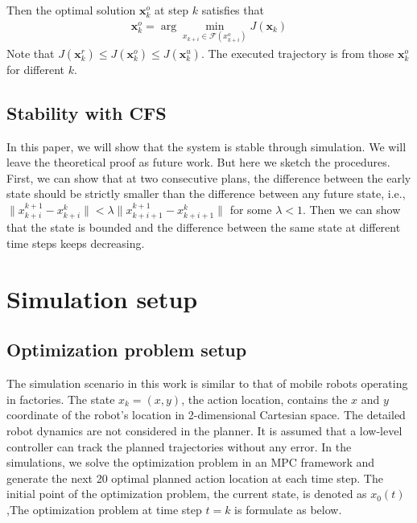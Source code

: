 \documentclass{ifacconf}
\begin{document}
Then the optimal solution $\mathbf{x}_k^{o}$ at step $k$ satisfies that
\begin{eqnarray}
\mathbf{x}_k^{o} = \arg\min_{x_{k+i}\in \mathcal{F}(x_{k+i}^o)}J(\mathbf{x}_k)
\end{eqnarray}
Note that $J(\mathbf{x}_k^{r})\leq J(\mathbf{x}_k^{o})\leq J(\mathbf{x}_k^{u})$. 
The executed trajectory is from those $\mathbf{x}_k^{o}$ for different $k$.


\subsection{Stability with CFS}
In this paper, we will show that the system is stable through simulation. We will leave the theoretical proof as future work. But here we sketch the procedures. First, we can show that at two consecutive plans, the difference between the early state should be strictly smaller than the difference between any future state, i.e., $\|x_{k+i}^{k+1}-x_{k+i}^k\|<\lambda\|x_{k+i+1}^{k+1}-x_{k+i+1}^k\|$ for some $\lambda<1$. Then we can show that the state is bounded and the difference between the same state at different time steps keeps decreasing.
%
%

\section{Simulation setup}
\subsection{Optimization problem setup}
The simulation scenario in this work is similar to that of mobile robots operating in factories. The state $x_{k} = (x,y)$, the action location, contains the $x$ and $y$ coordinate of the robot's location in 2-dimensional Cartesian space. The detailed robot dynamics are not considered in the planner.  It is assumed that a low-level controller can track the planned trajectories without any error. In the simulations, we solve the optimization problem in an MPC framework and generate the next 20 optimal planned action location at each time step. The initial point of the optimization problem, the current state, is denoted as $x_0(t)$,The optimization problem at time step $t=k$ is formulate as below. 
\end{document}
